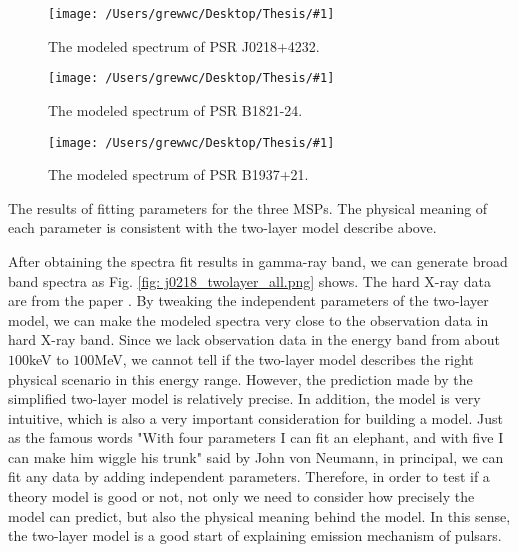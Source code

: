 \documentclass[12pt]{report}
\newcommand{\mycaption}[1]{\protect \caption{#1}}
\newcommand{\singleFig}[3]{
  \begin{figure}[!ht]
    \centering
    \texttt{[image: /Users/grewwc/Desktop/Thesis/\#1]}
    \caption{#3}
    \label{fig: #1}
  \end{figure}
}
\newcommand{\change}[1]{
  $<$\colorbox{red}{\textbf{change}}$>$#1$<$\colorbox{red}{\textbf{/change}}$>$
}
\newcommand{\mayChange}[1]{
  $<$\colorbox{red}{\textbf{mayChange}}$>$#1$<$\colorbox{red}{\textbf{/mayChange}}$>$
}
\begin{document}
          \singleFig{j0218_twolayer_cur.png}{0.41}{The modeled spectrum of PSR J0218+4232.}
          \singleFig{b1821_twolayer_cur.png}{0.4}{The modeled spectrum of PSR B1821-24.}
          \singleFig{j1939_twolayer_cur.png}{0.41}{The modeled spectrum of PSR B1937+21.}
          
          \begin{table}[!ht]
            \centering
            \mycaption{The results of fitting parameters for the three MSPs. The physical 
              meaning of each parameter is consistent with the two-layer model describe above.}
            \label{table: twolayer_fit_parameter}
          \end{table}
          \vspace{0.5cm}
          
          After obtaining the spectra fit results in gamma-ray band, we can generate broad band spectra 
          as Fig. \ref{fig: j0218_twolayer_all.png} shows. 
          The hard X-ray data are from the paper \cite{0004-637X-845-2-159}. By tweaking the 
          independent parameters of the two-layer model, we can make the modeled spectra very 
          close to the observation data in hard X-ray band. Since we lack observation data in 
          the energy band from about $100$keV to $100$MeV, we cannot tell if the two-layer model 
          describes the right physical scenario in this energy range. However, the prediction made 
          by the simplified two-layer model is relatively precise. In addition, the model is very 
          intuitive, which is also a very important consideration for building a model. Just as 
          the famous words "With four parameters I can fit an elephant, and with five I 
          can make him wiggle his trunk" 
          said by John von Neumann, in principal, we can fit any data by adding independent parameters. 
          Therefore, in order to test if a theory model is good or not, not only we need to consider 
          how precisely the model can predict, but also the physical meaning behind the model. In this 
          sense, the two-layer model is a good start of explaining emission mechanism of 
          pulsars. 
          
\end{document}
